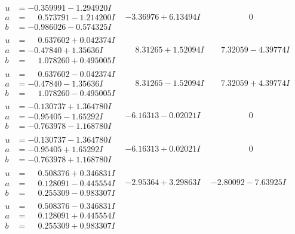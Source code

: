 \documentclass[1p]{elsarticle_modified}
\theoremstyle{definition}
\begin{document}
$$\begin{array}{c|c|c}
\begin{aligned}
u &= -0.359991 - 1.294920 I \\
a &= \phantom{-}0.573791 - 1.214200 I \\
b &= -0.986026 - 0.574325 I\end{aligned}
 & -3.36976 + 6.13494 I & \phantom{-0.000000 } 0 \\ \hline\begin{aligned}
u &= \phantom{-}0.637602 + 0.042374 I \\
a &= -0.47840 + 1.35636 I \\
b &= \phantom{-}1.078260 + 0.495005 I\end{aligned}
 & \phantom{-}8.31265 + 1.52094 I & \phantom{-}7.32059 - 4.39774 I \\ \hline\begin{aligned}
u &= \phantom{-}0.637602 - 0.042374 I \\
a &= -0.47840 - 1.35636 I \\
b &= \phantom{-}1.078260 - 0.495005 I\end{aligned}
 & \phantom{-}8.31265 - 1.52094 I & \phantom{-}7.32059 + 4.39774 I \\ \hline\begin{aligned}
u &= -0.130737 + 1.364780 I \\
a &= -0.95405 - 1.65292 I \\
b &= -0.763978 - 1.168780 I\end{aligned}
 & -6.16313 - 0.02021 I & \phantom{-0.000000 } 0 \\ \hline\begin{aligned}
u &= -0.130737 - 1.364780 I \\
a &= -0.95405 + 1.65292 I \\
b &= -0.763978 + 1.168780 I\end{aligned}
 & -6.16313 + 0.02021 I & \phantom{-0.000000 } 0 \\ \hline\begin{aligned}
u &= \phantom{-}0.508376 + 0.346831 I \\
a &= \phantom{-}0.128091 - 0.445554 I \\
b &= \phantom{-}0.255309 - 0.983307 I\end{aligned}
 & -2.95364 + 3.29863 I & -2.80092 - 7.63925 I \\ \hline\begin{aligned}
u &= \phantom{-}0.508376 - 0.346831 I \\
a &= \phantom{-}0.128091 + 0.445554 I \\
b &= \phantom{-}0.255309 + 0.983307 I\end{aligned}

\end{array}$$
\end{document}
